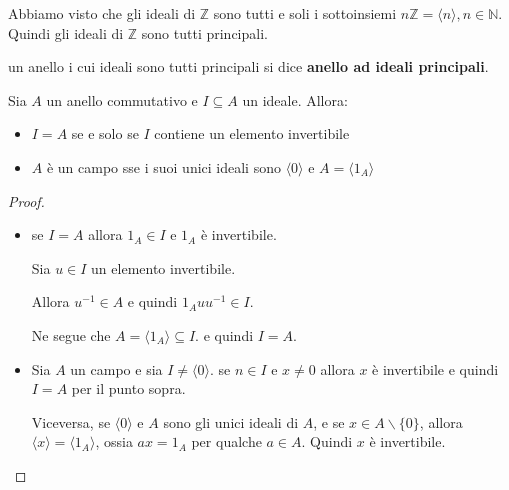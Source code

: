 \documentclass[../main.tex]{subfiles}
\begin{document}
\begin{example}
    Abbiamo visto che gli ideali di $\mathbb{Z} $ sono tutti e soli i sottoinsiemi $n \mathbb{Z}  = \langle n \rangle, n \in \mathbb{N} $.
    Quindi gli ideali di $\mathbb{Z} $ sono tutti principali.
\end{example}

\begin{definition}
    un anello i cui ideali sono tutti principali si dice \textbf{anello ad ideali principali}.
\end{definition}

\begin{proposition}
    Sia $A$ un anello commutativo e $I \subseteq A$ un ideale. Allora:
    \begin{itemize}
        \item $I = A$ se e solo se $I$ contiene un elemento invertibile
        \item $A$ è un campo sse i suoi unici ideali sono $\langle 0 \rangle$ e $A = \langle 1_A \rangle$
    \end{itemize}
\end{proposition}

\begin{proof}
    \
    \begin{itemize}
        \item se $I = A$ allora $1_A \in I$ e $1_A$ è invertibile.

              Sia $u \in I$ un elemento invertibile.

              Allora $u^{-1} \in A$ e quindi $1_A u u^{-1} \in I$.

              Ne segue che $A = \langle 1_A \rangle \subseteq I$. e quindi $I = A$.
        \item Sia $A$ un campo e sia $I \neq \langle 0 \rangle$. se $ n \in I$ e $x \neq 0$ allora $x$ è invertibile e quindi $I = A$
              per il punto sopra.

              Viceversa, se $\langle 0 \rangle$ e $A$ sono gli unici ideali di $A$,
              e se $x \in A  \backslash \{0\}$, allora $\langle x \rangle = \langle 1_A \rangle$, ossia $ax = 1_A$ per qualche $a \in A$. Quindi $x$ è invertibile.
    \end{itemize}
\end{proof}
\end{document}
